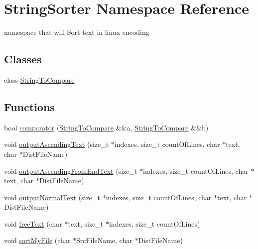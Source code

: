 \hypertarget{namespaceStringSorter}{}\section{String\+Sorter Namespace Reference}
\label{namespaceStringSorter}


namespace that will Sort text in linux encoding  


\subsection*{Classes}
\begin{DoxyCompactItemize}
\item 
class \hyperlink{classStringSorter_1_1StringToCompare}{String\+To\+Compare}
\end{DoxyCompactItemize}
\subsection*{Functions}
\begin{DoxyCompactItemize}
\item 
bool \hyperlink{namespaceStringSorter_aaec9bf5e9700c12c60a776b1bfa1482a}{comparator} (\hyperlink{classStringSorter_1_1StringToCompare}{String\+To\+Compare} \&\&a, \hyperlink{classStringSorter_1_1StringToCompare}{String\+To\+Compare} \&\&b)
\item 
void \hyperlink{namespaceStringSorter_af7a15976538bdcbc36377418cbf6c54c}{output\+Ascending\+Text} (size\+\_\+t $\ast$indexes, size\+\_\+t count\+Of\+Lines, char $\ast$text, char $\ast$Dist\+File\+Name)
\item 
void \hyperlink{namespaceStringSorter_aef5de617e1c1d77d92224c3f98924dc3}{output\+Ascending\+From\+End\+Text} (size\+\_\+t $\ast$indexes, size\+\_\+t count\+Of\+Lines, char $\ast$text, char $\ast$Dist\+File\+Name)
\item 
void \hyperlink{namespaceStringSorter_a8884132688cb022da1f41dac3eb21d75}{output\+Normal\+Text} (size\+\_\+t $\ast$indexes, size\+\_\+t count\+Of\+Lines, char $\ast$text, char $\ast$Dist\+File\+Name)
\item 
void \hyperlink{namespaceStringSorter_a49226981ae6a4fcc57865d9e2ba82d76}{free\+Text} (char $\ast$text, size\+\_\+t $\ast$indexes, size\+\_\+t count\+Of\+Lines)
\item 
void \hyperlink{namespaceStringSorter_a2e107a1808086f5e183cd5c9c48fe824}{sort\+My\+File} (char $\ast$Src\+File\+Name, char $\ast$Dist\+File\+Name)
\end{DoxyCompactItemize}


